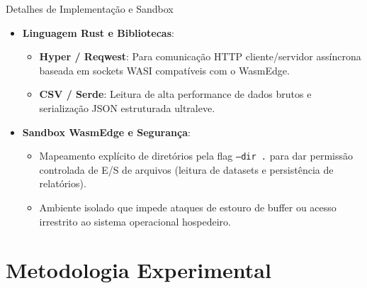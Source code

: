 \documentclass[aspectratio=169]{beamer}
\begin{document}
\begin{frame}{Detalhes de Implementação e Sandbox}
  \begin{itemize}
    \item \textbf{Linguagem Rust e Bibliotecas}:
      \begin{itemize}
        \item \textbf{Hyper / Reqwest}: Para comunicação HTTP cliente/servidor assíncrona baseada em sockets WASI compatíveis com o WasmEdge.
        \item \textbf{CSV / Serde}: Leitura de alta performance de dados brutos e serialização JSON estruturada ultraleve.
      \end{itemize}
    \vspace{0.3cm}
    \item \textbf{Sandbox WasmEdge e Segurança}:
      \begin{itemize}
        \item Mapeamento explícito de diretórios pela flag \texttt{--dir .} para dar permissão controlada de E/S de arquivos (leitura de datasets e persistência de relatórios).
        \item Ambiente isolado que impede ataques de estouro de buffer ou acesso irrestrito ao sistema operacional hospedeiro.
      \end{itemize}
  \end{itemize}
\end{frame}

\section{Metodologia Experimental}
\end{document}
